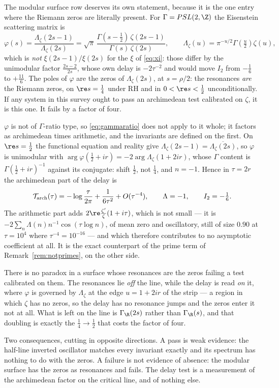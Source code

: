 \begin{remark}\label{rem:modular}
The modular surface row deserves its own statement, because it is the one entry
where the Riemann zeros are literally present. For $\Gamma=PSL(2,\Z)$ the
Eisenstein scattering matrix \cite{Iwaniec} is
\[
 \varphi(s)=\frac{\Lambda_\zeta(2s-1)}{\Lambda_\zeta(2s)}
 =\sqrt\pi\,\frac{\Gamma(s-\frac12)\,\zeta(2s-1)}{\Gamma(s)\,\zeta(2s)},
 \qquad \Lambda_\zeta(u)=\pi^{-u/2}\Gamma(\tfrac u2)\zeta(u),
\]
which is \emph{not} $\xi(2s-1)/\xi(2s)$ for the $\xi$ of \eqref{eq:xi}: those
differ by the unimodular factor $\frac{2s-2}{2s}$, whose own delay is $-2\tau^{-2}$
and would move $I_2$ from $-\frac16$ to $+\frac{11}6$. The poles of $\varphi$ are
the zeros of $\Lambda_\zeta(2s)$, at $s=\rho/2$: the resonances \emph{are} the
Riemann zeros, on $\re s=\frac14$ under RH and in $0<\re s<\frac12$
unconditionally. If any system in this survey ought to pass an archimedean test
calibrated on $\zeta$, it is this one. It fails by a factor of four.

$\varphi$ is not of $\Gamma$-ratio type, so \eqref{eq:gammaratio} does not apply to
it whole; it factors as archimedean times arithmetic, and the invariants are
defined on the first. On $\re s=\frac12$ the functional equation and reality give
$\Lambda_\zeta(2s-1)=\overline{\Lambda_\zeta(2s)}$, so $\varphi$ is unimodular with
$\arg\varphi(\frac12+ir)=-2\arg\Lambda_\zeta(1+2ir)$, whose $\Gamma$ content is
$\Gamma(\frac12+ir)^{-1}$ against its conjugate: shift $\frac12$, not $\frac14$,
and $n=-1$. Hence in $\tau=2r$ the archimedean part of the delay is
\[
 \mathcal T_{\rm arch}(\tau)=-\log\frac\tau{2\pi}+\frac1{6\tau^2}+O(\tau^{-4}),
 \qquad \Lambda=-1,\qquad I_2=-\tfrac16 .
\]
The arithmetic part adds $2\re\frac{\zeta'}{\zeta}(1+i\tau)$, which is not small
--- it is $-2\sum_n\Lambda(n)n^{-1}\cos(\tau\log n)$, of mean zero and oscillatory,
still of size $0.90$ at $\tau=10^4$ where $\tau^{-4}=10^{-16}$ --- and which
therefore contributes to no asymptotic coefficient at all. It is the exact
counterpart of the prime term of Remark~\ref{rem:notprimes}, on the other side.

There is no paradox in a surface whose resonances are the zeros failing a test
calibrated on them. The resonances lie \emph{off} the line, while the delay is
read \emph{on} it, where $\varphi$ is governed by $\Lambda_\zeta$ at the edge
$u=1+2ir$ of the strip --- a region in which $\zeta$ has no zeros, so the delay has
no resonance jumps and the zeros enter it not at all. What is left on the line is
$\Gamma_\R(2s)$ rather than $\Gamma_\R(s)$, and that doubling is exactly the
$\frac14\to\frac12$ that costs the factor of four.

Two consequences, cutting in opposite directions. A pass is weak evidence: the
half-line inverted oscillator matches every invariant exactly and its spectrum has
nothing to do with the zeros. A failure is not evidence of absence: the modular
surface has the zeros as resonances and fails. The delay test is a measurement of
the archimedean factor on the critical line, and of nothing else.
\end{remark}


